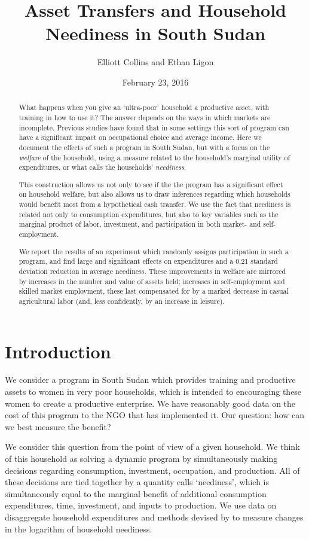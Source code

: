 \documentclass[11pt]{article}
\author{Elliott Collins and Ethan Ligon}
\date{February 23, 2016}
\title{Asset Transfers and Household Neediness in South Sudan}
\begin{document}
\maketitle
\begin{abstract}
What happens when you give an `ultra-poor' household a productive
asset, with training in how to use it?  The answer depends on the
ways in which markets are incomplete.  Previous studies have found
that in some settings this sort of program can have a significant
impact on occupational choice and average income.  Here we document
the effects of such a program in South Sudan, but with a focus on
the \emph{welfare} of the household, using a measure related to the
household's marginal utility of expenditures, or what \cite{ligon16a}
calls the households' \emph{neediness}.

This construction allows us not only to see if the the program has a
significant effect on household welfare, but also allows us to draw
inferences regarding which households would benefit most from a
hypothetical cash transfer.  We use the fact that neediness is
related not only to consumption expenditures, but also to key
variables such as the marginal product of labor, investment, and
participation in both market- and self-employment.

We report the results of an experiment which randomly assigns
participation in such a program, and find large and significant
effects on expenditures and a 0.21 standard deviation reduction in
average neediness.  These improvements in welfare are mirrored by
increases in the number and value of assets held; increases in
self-employment and skilled market employment, these last
compensated for by a marked decrease in casual agricultural labor
(and, less confidently, by an increase in leisure).
\end{abstract}

\section*{Introduction}
\label{sec-1}
We consider a program in South Sudan which provides training and
productive assets to women in very poor households, which is
intended to encouraging these women to create a productive
enterprise.  We have reasonably good data on the cost of this
program to the NGO that has implemented it.  Our question: how can
we best measure the benefit?

We consider this question from the point of view of a given
household.  We think of this household as solving a dynamic program
by simultaneously making decisions regarding consumption,
investment, occupation, and production.  All of these decisions are
tied together by a quantity \cite{ligon16a} calls `neediness', which
is simultaneously equal to the marginal benefit of additional
consumption expenditures, time, investment, and inputs to
production.  We use data on disaggregate household expenditures and
methods devised by \cite{ligon16a} to measure changes in the
logarithm of household neediness.
\end{document}
